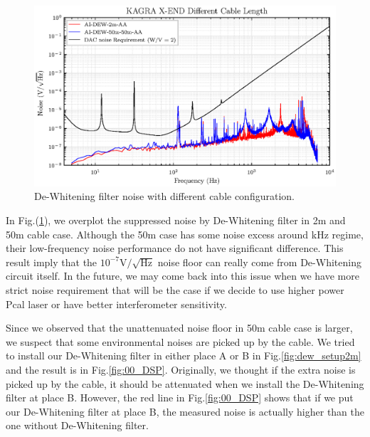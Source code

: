 \begin{figure}[hbt!]
\centering
\includegraphics[width=1\textwidth]{figure/noise/00_bothm}
\caption[De-Whitening filter noise with different cable length]{ De-Whitening filter noise with different cable configuration. }
\label{fig:00_bothm}
\end{figure}



In Fig.(\ref{fig:00_bothm}), we overplot the suppressed noise by De-Whitening filter in 2m and 50m cable case. Although the 50m case has some noise excess around kHz regime, their low-frequency noise performance do not have significant difference. This result imply that the $10^{-7}\mathrm{V}/\sqrt{\mathrm{Hz}}$ noise floor can really come from De-Whitening circuit itself. In the future, we may come back into this issue when we have more strict noise requirement that will be the case if we decide to use higher power Pcal laser or have better interferometer sensitivity.

Since we observed that the unattenuated noise floor in 50m cable case is larger, we suspect that some environmental noises are picked up by the cable. We tried to install our De-Whitening filter in either place A or B in Fig.\ref{fig:dew_setup2m} and the result is in Fig.\ref{fig:00_DSP}. Originally, we thought if the extra noise is picked up by the cable, it should be attenuated when we install the De-Whitening filter at place B. However, the red line in Fig.\ref{fig:00_DSP} shows that if we put our De-Whitening filter at place B, the measured noise is actually higher than the one without De-Whitening filter. 


